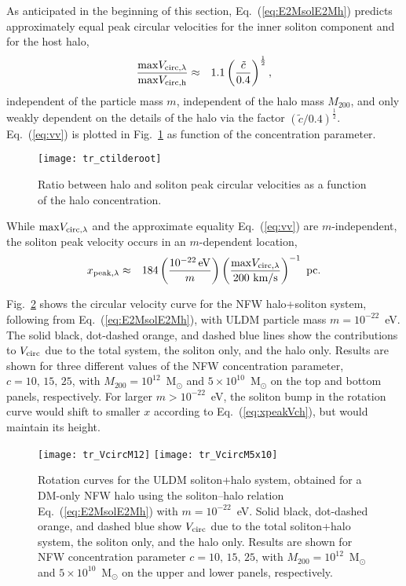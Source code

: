 \documentclass[aps,prd,floats,superscriptaddress,showpacs,nofootinbib,twocolumn,preprintnumbers]{revtex4-1}%
\def\be{\begin{eqnarray}}
\def\ee{\end{eqnarray}}
\begin{document}
As anticipated in the beginning of this section, 
Eq.~(\ref{eq:E2MsolE2Mh}) predicts approximately equal peak circular
velocities for the inner soliton component and for the host halo, 
%
\be\label{eq:vv}\frac{{\max}V_{\rm circ,\lambda}}{{\max}V_{\rm circ,h}}&\approx&1.1\left(\frac{\tilde c}{0.4}\right)^{\frac{1}{2}},\ee
%
independent of the particle mass $m$, independent of the halo mass
$M_{200}$, and only weakly dependent on the details of the halo via
the factor $(\tilde c/0.4)^{\frac{1}{2}}$. Eq.~(\ref{eq:vv}) 
is plotted in
Fig.~\ref{fig:ctilderoot} as function of the concentration parameter. 
%
\begin{figure}[hbp!]
\centering
\texttt{[image: tr\_ctilderoot]}
\caption{Ratio between halo and soliton peak circular
  velocities as a function of the halo concentration.
}\label{fig:ctilderoot}
\end{figure}
%

While ${\max}V_{\rm circ,\lambda}$ and the approximate equality
Eq.~(\ref{eq:vv}) are $m$-independent, the soliton peak velocity
occurs in an $m$-dependent location, 
%
\be\label{eq:xpeakVch} x_{\rm peak,\lambda}
&\approx&184\left(\frac{10^{-22}\,\rm
    eV}{m}\right)\left(\frac{{\max}V_{\rm circ,\lambda}}{200~\rm
    km/s}\right)^{-1}~{\rm pc}.
\ee
%

Fig.~\ref{fig:VcircM12} shows the circular velocity curve for the NFW
halo+soliton system, following from Eq.~(\ref{eq:E2MsolE2Mh}), with
ULDM particle mass $m=10^{-22}$~eV. The solid black, dot-dashed
orange, and dashed blue lines show the contributions to $V_{\rm circ}$
due to the total system, the soliton only, and the halo only. Results
are shown for three different values of the NFW concentration
parameter, $c=10,\,15,\,25$, with $M_{200}=10^{12}$~M$_\odot$ and
$5\times10^{10}$~M$_\odot$ on the top and bottom panels,
respectively. For larger $m>10^{-22}$~eV, the soliton bump in the
rotation curve would shift to smaller $x$ according to
Eq.~(\ref{eq:xpeakVch}), but would maintain its height. 
%
\begin{figure}[hbp!]
\centering
\texttt{[image: tr\_VcircM12]}
\texttt{[image: tr\_VcircM5x10]}
\caption{Rotation curves for the ULDM soliton+halo system, obtained
  for a DM-only NFW halo using the soliton--halo relation
  Eq.~(\ref{eq:E2MsolE2Mh}) with $m=10^{-22}$~eV. Solid black, 
    dot-dashed orange, and dashed blue show $V_{\rm circ}$ due to the
  total soliton+halo system, the soliton only, and the halo
  only. Results are shown for NFW concentration parameter
  $c=10,\,15,\,25$, with $M_{200}=10^{12}$~M$_\odot$ and
  $5\times10^{10}$~M$_\odot$ on the upper and lower panels,
  respectively.  
}\label{fig:VcircM12}
\end{figure}
%
\end{document}
